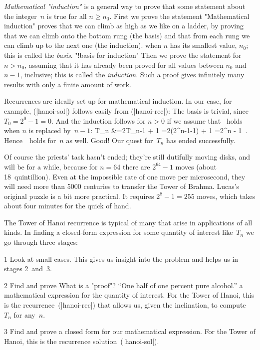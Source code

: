 {\it Mathematical "induction"\/} is a general way to prove that some statement
about the integer~$n$ is true for all $n\ge n_0$. First we prove the statement
\g\vskip18pt "Mathematical induction" proves that
 we can climb as high as we like on
a ladder, by proving that we can climb onto the bottom rung (the basis)\newline
and that from each rung we can climb up to the next one (the
induction).\g
when $n$ has its smallest value, $n_0$; this is called the {\it basis}.
"!basis for induction"
Then we prove the statement for $n>n_0$, assuming that it has already been proved
for all values between $n_0$ and $n-1$, inclusive;
this is called the {\it induction}.
Such a proof gives infinitely many results with only a finite amount of work.

Recurrences are ideally set up for mathematical induction. In our case,
for example, \eq(|hanoi-sol|) follows easily from \eq(|hanoi-rec|):
The basis is trivial, since $T_0=2^0-1=0$. And the induction follows for
$n>0$ if we assume that \thiseq\ holds when $n$ is replaced by~$n-1$:
\begindisplay
T_n &=2T_{n-1} + 1 =2(2^{n-1}-1) + 1 =2^n - 1 \,.
\enddisplay
Hence~\thiseq~holds for~$n$ as well. Good! Our
quest for~$T_n$ has ended successfully.

Of course the priests' task hasn't ended;
they're still dutifully moving disks, and will be for a while,
because for $n=64$ there are $2^{64}-1$ moves (about 18~quintillion).
Even at the impossible rate of one move per microsecond,
they will need more than 5000 centuries to transfer the Tower of Brahma.
Lucas's original puzzle is a bit more practical.
It requires $2^8-1 = 255$ moves,
which takes about four minutes for the quick of hand.

The Tower of Hanoi recurrence is typical of many that arise in
applications of all kinds.
In finding a closed-form expression
for some quantity of interest like~$T_n$
we go through three stages:
\smallskip
\item 1
Look at small cases.
This gives us insight into the problem and helps us in stages 2~and~3.

\item 2
Find and prove
\g What is a "proof"? ``One half of one percent pure alcohol.''\g
a mathematical expression for the quantity of interest.
For the Tower of Hanoi, this is the recurrence~\eq(|hanoi-rec|)
that allows us, given the inclination, to compute~$T_n$ for any~$n$.

\item 3
Find and prove a closed form for our mathematical expression.
For the Tower of Hanoi, this is the recurrence solution~\eq(|hanoi-sol|).

